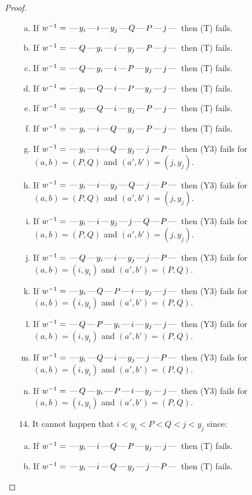 \documentclass[10pt]{article}
\theoremstyle{definition}
\theoremstyle{definition}
\def\dash{\text{\hspace{0.5mm}---\hspace{0.5mm}}}
\begin{document}
\begin{proof}
\begin{enumerate}
\begin{enumerate}[(a)]
\item If $w^{-1} = \dash y_i\dash i\dash y_j\dash Q\dash P\dash j\dash $ then (T) fails.
\item If $w^{-1} = \dash Q\dash y_i\dash i\dash y_j\dash P\dash j\dash $ then (T) fails.
\item If $w^{-1} = \dash Q\dash y_i\dash i\dash P\dash y_j\dash j\dash $ then (T) fails.
\item If $w^{-1} = \dash y_i\dash Q\dash i\dash P\dash y_j\dash j\dash $ then (T) fails.
\item If $w^{-1} = \dash y_i\dash Q\dash i\dash y_j\dash P\dash j\dash $ then (T) fails.
\item If $w^{-1} = \dash y_i\dash i\dash Q\dash y_j\dash P\dash j\dash $ then (T) fails.
\item If $w^{-1} = \dash y_i\dash i\dash Q\dash y_j\dash j\dash P\dash $ then (Y3) fails for $(a,b)=(P,Q)$ and $(a',b')=(j,y_j)$.
\item If $w^{-1} = \dash y_i\dash i\dash y_j\dash Q\dash j\dash P\dash $ then (Y3) fails for $(a,b)=(P,Q)$ and $(a',b')=(j,y_j)$.
\item If $w^{-1} = \dash y_i\dash i\dash y_j\dash j\dash Q\dash P\dash $ then (Y3) fails for $(a,b)=(P,Q)$ and $(a',b')=(j,y_j)$.
\item If $w^{-1} = \dash Q\dash y_i\dash i\dash y_j\dash j\dash P\dash $ then (Y3) fails for $(a,b)=(i,y_i)$ and $(a',b')=(P,Q)$.
\item If $w^{-1} = \dash y_i\dash Q\dash P\dash i\dash y_j\dash j\dash $ then (Y3) fails for $(a,b)=(i,y_i)$ and $(a',b')=(P,Q)$.
\item If $w^{-1} = \dash Q\dash P\dash y_i\dash i\dash y_j\dash j\dash $ then (Y3) fails for $(a,b)=(i,y_i)$ and $(a',b')=(P,Q)$.
\item If $w^{-1} = \dash y_i\dash Q\dash i\dash y_j\dash j\dash P\dash $ then (Y3) fails for $(a,b)=(i,y_i)$ and $(a',b')=(P,Q)$.
\item If $w^{-1} = \dash Q\dash y_i\dash P\dash i\dash y_j\dash j\dash $ then (Y3) fails for $(a,b)=(i,y_i)$ and $(a',b')=(P,Q)$.
\end{enumerate}
\item[$14$.] It cannot happen that $i < y_i < P < Q < j < y_j$ since:
\begin{enumerate}[(a)]
\item If $w^{-1} = \dash y_i\dash i\dash Q\dash P\dash y_j\dash j\dash $ then (T) fails.
\item If $w^{-1} = \dash y_i\dash i\dash Q\dash y_j\dash j\dash P\dash $ then (T) fails.

\end{enumerate}
\end{enumerate}
\end{proof}
\end{document}
